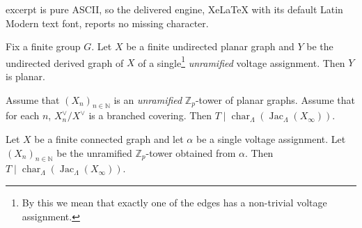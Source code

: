 \documentclass[10pt,a4paper]{amsart}
\newcommand{\Char}{\operatorname{char}}
\newcommand{\Jac}{\operatorname{Jac}}
\newcommand{\Z}{\mathbb{Z}}
\begin{document}
excerpt is pure ASCII, so the delivered engine, XeLaTeX with its default Latin Modern text font, reports no missing character.
\begin{theorem}
\label{thm:planar}
Fix a finite group $G$.
Let $X$ be a finite undirected planar graph and $Y$ be the undirected derived graph of $X$ of a single\footnote{By this we mean that exactly one of the edges has a non-trivial voltage assignment.} \emph{unramified} voltage assignment.
Then $Y$ is planar.
\end{theorem}

\begin{corollary}
\label{cor:app}
Assume that $(X_n)_{n\in \mathbb{N}}$ is an \emph{unramified} $\Z_p$-tower of planar graphs.
Assume that for each $n$, $X_n^\vee/X^\vee$ is a branched covering. 
Then $T\mid \Char_\Lambda({\Jac}_\Lambda(X_\infty))$.
\end{corollary}

\begin{corollary}
{Let $X$ be a finite connected graph and let $\alpha$ be a single voltage assignment.
Let $(X_n)_{n\in \mathbb{N}}$ be the unramified $\Z_p$-tower obtained from $\alpha$.
Then $T\mid \Char_\Lambda(\Jac_\Lambda(X_\infty))$.}
\end{corollary}
\end{document}
